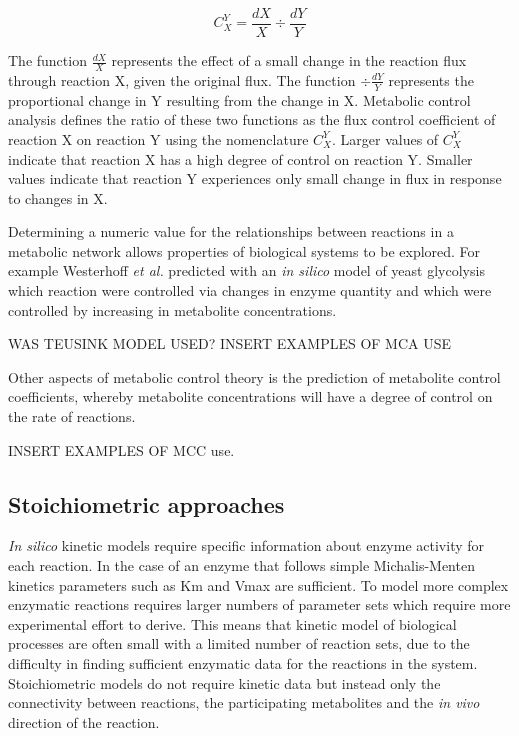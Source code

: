 \begin{equation}\label{fcc}
C_{X}^{Y} = \frac{dX}{X}\div\frac{dY}{Y}
\end{equation}

The function $\frac{dX}{X}$ represents the effect of a small change in the reaction flux through reaction X, given the original flux. The function $\div\frac{dY}{Y}$ represents the proportional change in Y resulting from the change in X. Metabolic control analysis defines the ratio of these two functions as the flux control coefficient of reaction X on reaction Y using the nomenclature $C_{X}^{Y}$. Larger values of $C_{X}^{Y}$ indicate that reaction X has a high degree of control on reaction Y. Smaller values indicate that reaction Y experiences only small change in flux in response to changes in X.

Determining a numeric value for the relationships between reactions in a metabolic network allows properties of biological systems to be explored. For example Westerhoff \emph{et al.} \cite{hierarchical_control} predicted with an \emph{in silico} model of yeast glycolysis \cite{teusink} which reaction were controlled via changes in enzyme quantity and which were controlled by increasing in metabolite concentrations.

WAS TEUSINK MODEL USED?
INSERT EXAMPLES OF MCA USE

Other aspects of metabolic control theory is the prediction of metabolite control coefficients, whereby metabolite concentrations will have a degree of control on the rate of reactions.

INSERT EXAMPLES OF MCC use.

\subsection{Stoichiometric approaches}

\emph{In silico} kinetic models require specific information about enzyme activity for each reaction. In the case of an enzyme that follows simple Michalis-Menten kinetics parameters such as Km and Vmax are sufficient. To model more complex enzymatic reactions requires larger numbers of parameter sets which require more experimental effort to derive. This means that kinetic model of biological processes are often small with a limited number of reaction sets, due to the difficulty in finding sufficient enzymatic data for the reactions in the system. Stoichiometric models do not require kinetic data but instead only the connectivity between reactions, the participating metabolites and the \emph{in vivo} direction of the reaction.

